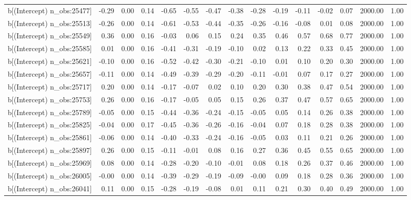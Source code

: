 \begin{table}[ht]
\begin{tabular}{rrrrrrrrrrrrrrr}
  b[(Intercept) n\_obs:25477] & -0.29 & 0.00 & 0.14 & -0.65 & -0.55 & -0.47 & -0.38 & -0.28 & -0.19 & -0.11 & -0.02 & 0.07 & 2000.00 & 1.00 \\ 
  b[(Intercept) n\_obs:25513] & -0.26 & 0.00 & 0.14 & -0.61 & -0.53 & -0.44 & -0.35 & -0.26 & -0.16 & -0.08 & 0.01 & 0.08 & 2000.00 & 1.00 \\ 
  b[(Intercept) n\_obs:25549] & 0.36 & 0.00 & 0.16 & -0.03 & 0.06 & 0.15 & 0.24 & 0.35 & 0.46 & 0.57 & 0.68 & 0.77 & 2000.00 & 1.00 \\ 
  b[(Intercept) n\_obs:25585] & 0.01 & 0.00 & 0.16 & -0.41 & -0.31 & -0.19 & -0.10 & 0.02 & 0.13 & 0.22 & 0.33 & 0.45 & 2000.00 & 1.00 \\ 
  b[(Intercept) n\_obs:25621] & -0.10 & 0.00 & 0.16 & -0.52 & -0.42 & -0.30 & -0.21 & -0.10 & 0.01 & 0.10 & 0.20 & 0.30 & 2000.00 & 1.00 \\ 
  b[(Intercept) n\_obs:25657] & -0.11 & 0.00 & 0.14 & -0.49 & -0.39 & -0.29 & -0.20 & -0.11 & -0.01 & 0.07 & 0.17 & 0.27 & 2000.00 & 1.00 \\ 
  b[(Intercept) n\_obs:25717] & 0.20 & 0.00 & 0.14 & -0.17 & -0.07 & 0.02 & 0.10 & 0.20 & 0.30 & 0.38 & 0.47 & 0.54 & 2000.00 & 1.00 \\ 
  b[(Intercept) n\_obs:25753] & 0.26 & 0.00 & 0.16 & -0.17 & -0.05 & 0.05 & 0.15 & 0.26 & 0.37 & 0.47 & 0.57 & 0.65 & 2000.00 & 1.00 \\ 
  b[(Intercept) n\_obs:25789] & -0.05 & 0.00 & 0.15 & -0.44 & -0.36 & -0.24 & -0.15 & -0.05 & 0.05 & 0.14 & 0.26 & 0.38 & 2000.00 & 1.00 \\ 
  b[(Intercept) n\_obs:25825] & -0.04 & 0.00 & 0.17 & -0.45 & -0.36 & -0.26 & -0.16 & -0.04 & 0.07 & 0.18 & 0.28 & 0.38 & 2000.00 & 1.00 \\ 
  b[(Intercept) n\_obs:25861] & -0.06 & 0.00 & 0.14 & -0.40 & -0.33 & -0.24 & -0.16 & -0.05 & 0.03 & 0.11 & 0.21 & 0.26 & 2000.00 & 1.00 \\ 
  b[(Intercept) n\_obs:25897] & 0.26 & 0.00 & 0.15 & -0.11 & -0.01 & 0.08 & 0.16 & 0.27 & 0.36 & 0.45 & 0.55 & 0.65 & 2000.00 & 1.00 \\ 
  b[(Intercept) n\_obs:25969] & 0.08 & 0.00 & 0.14 & -0.28 & -0.20 & -0.10 & -0.01 & 0.08 & 0.18 & 0.26 & 0.37 & 0.46 & 2000.00 & 1.00 \\ 
  b[(Intercept) n\_obs:26005] & -0.00 & 0.00 & 0.14 & -0.39 & -0.29 & -0.19 & -0.09 & -0.00 & 0.09 & 0.18 & 0.28 & 0.36 & 2000.00 & 1.00 \\ 
  b[(Intercept) n\_obs:26041] & 0.11 & 0.00 & 0.15 & -0.28 & -0.19 & -0.08 & 0.01 & 0.11 & 0.21 & 0.30 & 0.40 & 0.49 & 2000.00 & 1.00 \\ 

\end{tabular}
\end{table}
